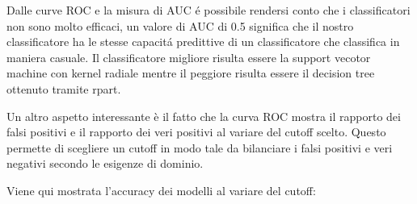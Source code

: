 Dalle curve ROC e la misura di AUC é possibile rendersi conto che i
classificatori non sono molto efficaci, un valore di AUC di 0.5
significa che il nostro classificatore ha le stesse capacitá
predittive di un classificatore che classifica in maniera casuale. Il
classificatore migliore risulta essere la support vecotor machine con
kernel radiale mentre il peggiore risulta essere il decision tree
ottenuto tramite rpart.

Un altro aspetto interessante è il fatto che la curva ROC mostra il rapporto dei falsi positivi e il rapporto dei veri positivi al variare del cutoff scelto. Questo permette di scegliere un cutoff in modo tale da bilanciare i falsi positivi e veri negativi secondo le esigenze di dominio.

Viene qui mostrata l'accuracy dei modelli al variare del cutoff:

